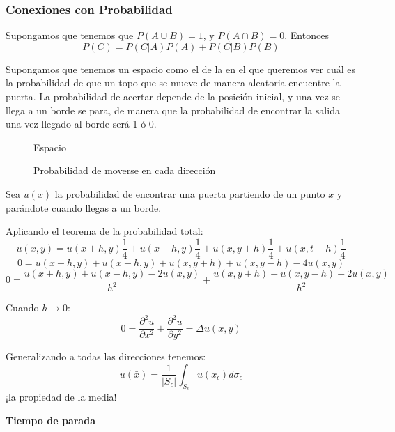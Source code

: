 		\subsubsection{Conexiones con Probabilidad}
		\begin{theorem} $ $\\ %
		Supongamos que tenemos que $P(A \cup B) = 1$, y $P(A \cap B) = 0$. Entonces
		\[P(C) = P(C|A) P(A) + P(C|B) P(B)\]
		\end{theorem}

		\begin{example}
		Supongamos que tenemos un espacio como el de la  en el que queremos ver cuál es la probabilidad de que un topo que se mueve de manera aleatoria encuentre la puerta. La probabilidad de acertar depende de la posición inicial, y una vez se llega a un borde se para, de manera que la probabilidad de encontrar la salida una vez llegado al borde será 1 ó 0.

		\begin{figure}[hbtp]
			\begin{minipage}[m]{0.5\textwidth}
			\caption{Espacio}
			\label{fig:ejemploProb}
			\end{minipage}
			\begin{minipage}[m]{0.5\textwidth}
			\caption{Probabilidad de moverse en cada dirección}
			\label{fig:ejemploProbDir}
			\end{minipage}
		\end{figure}

		Sea $u(x)$ la probabilidad de encontrar una puerta partiendo de un punto $x$ y parándote cuando llegas a un borde.

		Aplicando el teorema de la probabilidad total:
		\[ u(x,y) = u(x+h,y) \frac{1}{4} + u(x-h,y) \frac{1}{4} + u(x,y+h)\frac{1}{4} + u(x,t-h)\frac{1}{4} \]
		\[ 0 = u(x+h,y) + u(x-h,y)+ u(x,y+h) + u(x,y-h) - 4u(x,y) \]
		\[ 0 = \frac{u(x+h,y) + u(x-h,y) -2u(x,y)}{h^2} + \frac{u(x,y+h) + u(x,y-h) - 2u(x,y)}{h^2} \]

		Cuando $h \to 0$:
		\[ 0 = \frac{\partial^2 u}{\partial x^2} + \frac{\partial^2 u}{\partial y^2} = \Delta u(x,y)\]

		Generalizando a todas las direcciones tenemos:
		\[ u(\bar{x}) = \frac{1}{|S_\epsilon|}\int_{S_\epsilon} u(x_\epsilon) d \sigma_{\epsilon}\]
		¡la propiedad de la media!

		\textbf{Tiempo de parada}


\end{example}
